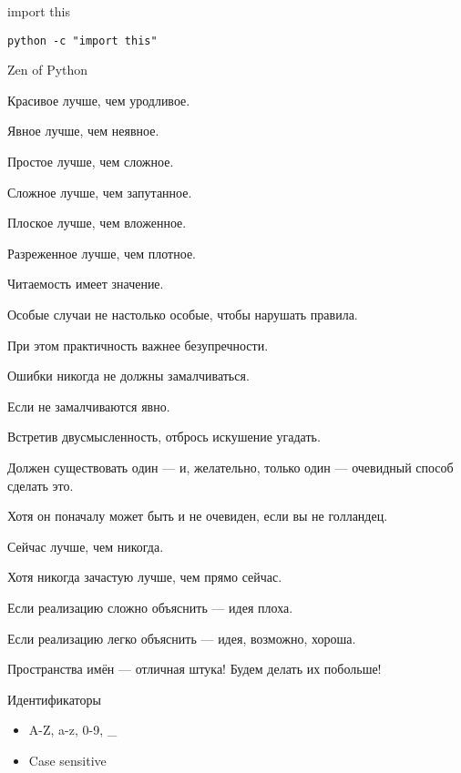 \documentclass[hyperref={pdftex,unicode}]{beamer}
\begin{document}
\begin{frame}[fragile]{import this}
  \begin{center}
    \texttt{python -c "import this"}
  \end{center}
\end{frame}

\begin{frame}{Zen of Python}
\footnotesize{
Красивое лучше, чем уродливое.

Явное лучше, чем неявное.

Простое лучше, чем сложное.

Сложное лучше, чем запутанное.

Плоское лучше, чем вложенное.

Разреженное лучше, чем плотное.

Читаемость имеет значение.

Особые случаи не настолько особые, чтобы нарушать правила.

При этом практичность важнее безупречности.

Ошибки никогда не должны замалчиваться.

Если не замалчиваются явно.

Встретив двусмысленность, отбрось искушение угадать.

Должен существовать один --- и, желательно, только один — очевидный способ сделать это.

Хотя он поначалу может быть и не очевиден, если вы не голландец.

Сейчас лучше, чем никогда.

Хотя никогда зачастую лучше, чем прямо сейчас.

Если реализацию сложно объяснить — идея плоха.

Если реализацию легко объяснить — идея, возможно, хороша.

Пространства имён — отличная штука! Будем делать их побольше!}
\end{frame}

\begin{frame}{Идентификаторы}
  \begin{itemize}
    \item A-Z, a-z, 0-9, \_
    \item Case sensitive
  \end{itemize}
\end{frame}
\end{document}
